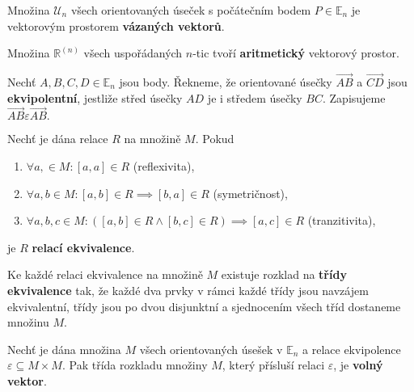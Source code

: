 \begin{pozn}
    Množina $\mathscr U_n$ všech orientovaných úseček s počátečním bodem $P\in \mathbb E_n$
    je vektorovým prostorem
    \textbf{vázaných vektorů}.
\end{pozn}

\begin{pozn}
    Množina $\mathbb R^{(n)}$ všech uspořádaných $n$-tic tvoří \textbf{aritmetický}
    vektorový prostor.
\end{pozn}

\begin{definition}
    Nechť $A,B,C,D \in \mathbb E_n$ jsou body. Řekneme, že orientované úsečky
    $\overrightarrow{AB}$ a $\overrightarrow{CD}$ jsou \textbf{ekvipolentní}, jestliže
    střed úsečky $AD$ je i středem úsečky $BC$. Zapisujeme $\overrightarrow{AB}\varepsilon\overrightarrow{AB}.$
\end{definition}

\begin{definition}
    Nechť je dána relace $R$ na množině $M$. Pokud
    \begin{enumerate}[$i.$]
    \item $\forall a,\in M:[a,a] \in R$ (reflexivita),
   	\item $\forall a,b\in M: [a,b]\in R \implies [b,a] \in R$ (symetričnost),
   	\item $\forall a,b,c\in M: ([a,b]\in R \land [b,c] \in R) \implies [a,c] \in R$ (tranzitivita),
    \end{enumerate}
    je $R$ \textbf{relací ekvivalence}.
\end{definition}

\begin{pozn}
    Ke každé relaci ekvivalence na množině $M$ existuje rozklad na
    \textbf{třídy ekvivalence} tak, že každé dva prvky v rámci každé třídy jsou navzájem ekvivalentní,
    třídy jsou po dvou disjunktní a sjednocením všech tříd dostaneme množinu $M$.
\end{pozn}

\begin{definition}
    Nechť je dána množina $M$ všech orientovaných úsešek v $\mathbb E_n$ a
    relace ekvipolence $\varepsilon \subseteq M\times M.$ Pak třída rozkladu množiny
    $M$, který přísluší relaci $\varepsilon$, je \textbf{volný vektor}.
\end{definition}

